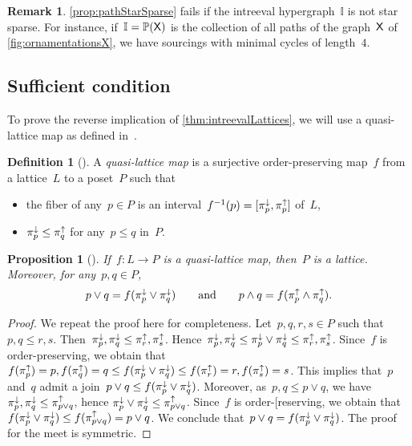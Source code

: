 \documentclass{amsart}
\newtheorem{proposition}[theorem]{Proposition}
\theoremstyle{definition}
\newtheorem{definition}[theorem]{Definition}
\newtheorem{remark}[theorem]{Remark}
\newcommand{\darkblue}{\color{darkblue}} %
\newcommand{\defn}[1]{\textsl{\darkblue #1}} %
\newcommand{\meet}{\wedge} %
\newcommand{\join}{\vee} %
\newcommand{\projDown}[1]{\smash{\pi^\downarrow_{#1}}} %
\newcommand{\projUp}[1]{\smash{\pi^\uparrow_{#1}}} %
\newcommand{\II}{\mathbb I} %
\newcommand{\PP}{\mathbb P} %
\newcommand{\Xgraph}{\sf X} %
\begin{document}
\begin{remark}
\cref{prop:pathStarSparse} fails if the intreeval hypergraph~$\II$ is not star sparse.
For instance, if~$\II = \PP(\Xgraph)$ is the collection of all paths of the graph~$\Xgraph$ of \cref{fig:ornamentationsX}, we have sourcings with minimal cycles of length~$4$.
\end{remark}


\subsection{Sufficient condition}
\label{subsec:sufficient}

To prove the reverse implication of \cref{thm:intreevalLattices}, we will use a quasi-lattice map as defined in~\cite[Rem.~4.14]{BergeronPilaud}.

\begin{definition}[{\cite[Rem.~4.14]{BergeronPilaud}}]
\label{def:quasiLatticeMap}
A \defn{quasi-lattice map} is a surjective order-preserving map~$f$ from a lattice~$L$ to a poset~$P$ such that
\begin{itemize}
\item the fiber of any~$p \in P$ is an interval~$f^{-1}(p) = [\projDown{p}, \projUp{p}]$ of~$L$,
\item $\projDown{p} \le \projUp{q}$ for any~$p \le q$ in~$P$.
\end{itemize}
\end{definition}

\begin{proposition}[{\cite[Rem.~4.14]{BergeronPilaud}}]
\label{prop:quasiLatticeMap}
If~$f : L \to P$ is a quasi-lattice map, then~$P$ is a lattice. 
Moreover, for any~$p,q \in P$,
\[
p \join q = f(\projDown{p} \join \projDown{q})
\qquad\text{and}\qquad
p \meet q = f(\projUp{p} \meet \projUp{q}).
\]
\end{proposition}

\begin{proof}
We repeat the proof here for completeness.
Let~$p,q,r,s \in P$ such that~$p, q \le r, s$.
Then~$\projDown{p} , \projDown{q} \le \projUp{r},  \projUp{s}$.
Hence~$\projDown{p}, \projDown{q} \le \projDown{p} \join \projDown{q} \le \projUp{r}, \projUp{s}$.
Since~$f$ is order-preserving, we obtain that~$f(\projUp{p}) = p, f(\projUp{q}) = q \le f(\projDown{p} \join \projDown{q}) \le f(\projUp{r}) = r, f(\projUp{s}) = s$.
This implies that~$p$ and~$q$ admit a join~$p \join q \le f(\projDown{p} \join \projDown{q})$.
Moreover, as~$p, q \le p \join q$, we have~$\projDown{p}, \projDown{q} \le \projUp{p \join q}$, hence $\projDown{p} \join \projDown{q} \le \projUp{p \join q}$.
Since~$f$ is order-[reserving, we obtain that~$f(\projDown{p} \join \projDown{q}) \le f(\projUp{p \join q}) = p \join q$.
We conclude that~$p \join q = f(\projDown{p} \join \projDown{q})$.
The proof for the meet is symmetric.
\end{proof}
\end{document}
